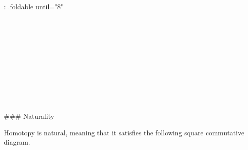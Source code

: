 {: .foldable until="8"}
\begin{code}%
\>[0]\<%
\\
\>[0]\<%
\\
\>[0][@{}l@{\AgdaIndent{0}}]%
\>[2]\AgdaSymbol{:}\AgdaSpace{}%
\AgdaSpace{}%
\AgdaSymbol{\{}\AgdaSpace{}%
\AgdaSpace{}%
\AgdaSymbol{\}}\AgdaSpace{}%
\AgdaSymbol{\{}\AgdaSpace{}%
\AgdaSymbol{:}\AgdaSpace{}%
\AgdaSpace{}%
\AgdaSymbol{\}}\AgdaSpace{}%
\AgdaSymbol{\{}\AgdaSpace{}%
\AgdaSymbol{:}\AgdaSpace{}%
\AgdaSpace{}%
\AgdaSymbol{\}}\AgdaSpace{}%
\AgdaSymbol{\{}\AgdaSpace{}%
\AgdaSymbol{:}\AgdaSpace{}%
\AgdaSpace{}%
\AgdaSymbol{\}}\<%
\\
%
\>[2]\AgdaSpace{}%
\AgdaSymbol{\{}\AgdaSpace{}%
\AgdaSpace{}%
\AgdaSymbol{:}\AgdaSpace{}%
\AgdaSpace{}%
\AgdaSpace{}%
\AgdaSymbol{\}}\<%
\\
%
\>[2]\AgdaSpace{}%
\AgdaSymbol{(}\AgdaSpace{}%
\AgdaSymbol{:}\AgdaSpace{}%
\AgdaSpace{}%
\AgdaSpace{}%
\AgdaSymbol{)}\<%
\\
%
\>[2]\AgdaSpace{}%
\AgdaSpace{}%
\AgdaSpace{}%
\<%
\\
%
\>[2]\AgdaComment{-------------------}\<%
\\
%
\>[2]\AgdaSpace{}%
\AgdaSymbol{(}\AgdaSpace{}%
\AgdaSpace{}%
\AgdaSymbol{)}\AgdaSpace{}%
\AgdaSpace{}%
\AgdaSymbol{(}\AgdaSpace{}%
\AgdaSpace{}%
\AgdaSymbol{)}\<%
\\
%
\\[\AgdaEmptyExtraSkip]%
\>[0]\AgdaSpace{}%
\AgdaSpace{}%
\AgdaSpace{}%
\AgdaSymbol{=}\AgdaSpace{}%
\AgdaSpace{}%
\AgdaSpace{}%
\AgdaSymbol{(}\AgdaSpace{}%
\AgdaSymbol{)}\<%
\end{code}


### Naturality

Homotopy is natural, meaning that it satisfies the following
square commutative diagram.

